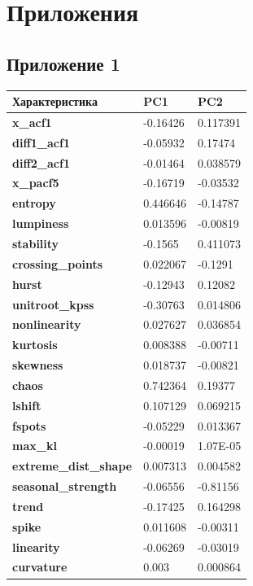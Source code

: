 \documentclass[a4paper,12pt]{article}
\begin{document}
\newpage
\section{Приложения}

\subsection{Приложение 1}
\label{prcomp}
\begin{tabular}{|
		>{\columncolor[HTML]{91FF91}}l |l|l|}
	\hline
	\textbf{Характеристика} & \cellcolor[HTML]{91FF91}\textbf{PC1} & \cellcolor[HTML]{91FF91}\textbf{PC2} \\ \hline
	\textbf{x\_acf1} & -0.16426 & 0.117391 \\ \hline
	\textbf{diff1\_acf1} & -0.05932 & 0.17474 \\ \hline
	\textbf{diff2\_acf1} & -0.01464 & 0.038579 \\ \hline
	\textbf{x\_pacf5} & -0.16719 & -0.03532 \\ \hline
	\textbf{entropy} & 0.446646 & -0.14787 \\ \hline
	\textbf{lumpiness} & 0.013596 & -0.00819 \\ \hline
	\textbf{stability} & -0.1565 & 0.411073 \\ \hline
	\textbf{crossing\_points} & 0.022067 & -0.1291 \\ \hline
	\textbf{hurst} & -0.12943 & 0.12082 \\ \hline
	\textbf{unitroot\_kpss} & -0.30763 & 0.014806 \\ \hline
	\textbf{nonlinearity} & 0.027627 & 0.036854 \\ \hline
	\textbf{kurtosis} & 0.008388 & -0.00711 \\ \hline
	\textbf{skewness} & 0.018737 & -0.00821 \\ \hline
	\textbf{chaos} & 0.742364 & 0.19377 \\ \hline
	\textbf{lshift} & 0.107129 & 0.069215 \\ \hline
	\textbf{fspots} & -0.05229 & 0.013367 \\ \hline
	\textbf{max\_kl} & -0.00019 & 1.07E-05 \\ \hline
	\textbf{extreme\_dist\_shape} & 0.007313 & 0.004582 \\ \hline
	\textbf{seasonal\_strength} & -0.06556 & -0.81156 \\ \hline
	\textbf{trend} & -0.17425 & 0.164298 \\ \hline
	\textbf{spike} & 0.011608 & -0.00311 \\ \hline
	\textbf{linearity} & -0.06269 & -0.03019 \\ \hline
	\textbf{curvature} & 0.003 & 0.000864 \\ \hline
\end{tabular}
\end{document}
